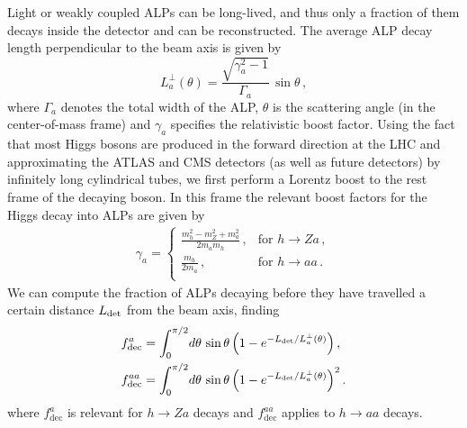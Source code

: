 Light or weakly coupled ALPs can be long-lived, and thus only a fraction of them decays inside the detector and can be reconstructed. The average ALP decay length perpendicular to the beam axis is given by
%
\begin{equation}\label{eq:Lperp}
   L_a^\perp(\theta) = \frac{\sqrt{\gamma_a^2 - 1}}{\Gamma_a}\,\sin\theta \,, 
\end{equation}
%
where $\Gamma_a$ denotes the total width of the ALP, $\theta$ is the scattering angle (in the center-of-mass frame) and $\gamma_a$ specifies the relativistic boost factor. Using the fact that most Higgs bosons are produced in the forward direction at the LHC and approximating the ATLAS and CMS detectors (as well as future detectors) by infinitely long cylindrical tubes, we first perform a Lorentz boost to the rest frame of the decaying boson. In this frame the relevant boost factors for the Higgs decay into ALPs are given by
\begin{align}
\gamma_a=\begin{cases}\displaystyle{ \frac{m_h^2-m_Z^2+m_a^2}{2m_am_h}}\,,& \text{for}\,\, h \to Z a\,,\\[14pt]
\displaystyle \frac{m_h}{2m_a}\,,&\text{for}\,\, h \to aa\,.\\
\end{cases}
\end{align}
%
We can compute the fraction of ALPs decaying before they have travelled a certain distance $L_{\rm det}$ from the beam axis, finding 
%
\begin{equation}\label{eq:ffactors}
\begin{aligned}
   f_{\rm dec}^{a} &= \int_0^{\pi/2}\!d\theta \,  \sin\theta
    \left( 1 - e^{-L_{\rm det}/L_a^\perp(\theta)} \right) , \\
   f_{\rm dec}^{aa} &= \int_0^{\pi/2}\!d\theta \,  \sin\theta
    \left( 1 - e^{-L_{\rm det}/L_a^\perp(\theta)} \right)^2.
\end{aligned}
\end{equation} 
%
where $f^a_\text{dec}$ is relevant for $h \to Z a$ decays and $f^{aa}_\text{dec}$ applies to $h\to aa$ decays. 


